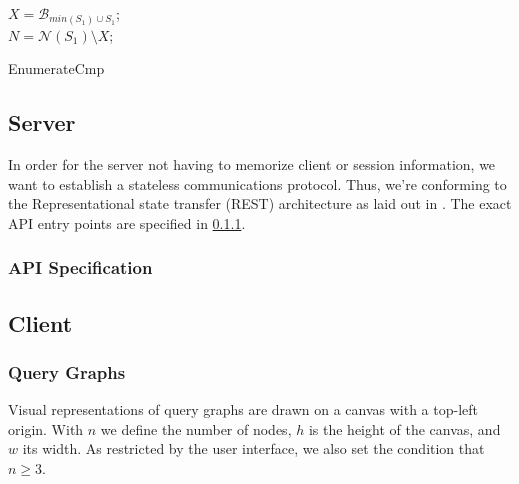 \begin{algorithm}
    \BlankLine
    $X = \mathcal{B}_{min(S_1) \cup S_1}$;\\
    $N = \mathcal{N}(S_1)\setminus X$;\\
    \vspace{0.5cm}
    \caption{EnumerateCmp}    
\end{algorithm}

\subsection{Server}

In order for the server not having to memorize client or session information, we want to establish a stateless communications protocol.
Thus, we're conforming to the Representational state transfer (REST) architecture as laid out in \cite{fielding2000architectural}.
The exact API entry points are specified in \ref{sub:api-entry-points}.

\subsubsection{API Specification}
\label{sub:api-entry-points}

\subsection{Client}

\subsubsection{Query Graphs}

Visual representations of query graphs are drawn on a canvas with a top-left origin.
With $n$ we define the number of nodes, $h$ is the height of the canvas, and $w$ its width. 
As restricted by the user interface, we also set the condition that $n \geq 3$.

